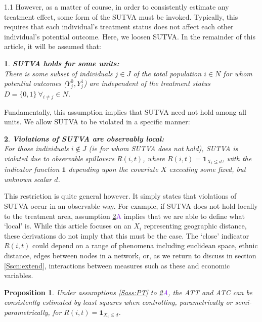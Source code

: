 \documentclass{article}
\makeatletter
\newtheorem{proposition}{Proposition}
\newtheorem*{assumption*}{\assumptionnumber}
\providecommand{\assumptionnumber}{}
\newenvironment{assumption}[2]
 {%
  \renewcommand{\assumptionnumber}{Assumption #1{#2}}%
  \begin{assumption*}%
  \protected@edef\@currentlabel{#1}%
 }
 {%
  \end{assumption*}
 }
\newcommand{\asref}[2]{\ref{#1}{\textcolor{BlueViolet}{#2}}}
\makeatother
\begin{document}
\begin{spacing}{1.1}
However, as a matter of course, in order to consistently estimate any
treatment effect, some form of the SUTVA must be invoked.  Typically,
this requires that each individual's treatment status does not affect
each other individual's potential outcome.  Here, we loosen SUTVA. 
In the remainder of this article, it will be assumed that:
\begin{assumption}{3}{}
\label{Sass:SUTVAs}
\textbf{SUTVA holds for some units:} \\
There is some subset of individuals $j\in J$ of the total population $i\in N$ 
for whom potential outcomes ($Y_j^0, Y_j^1$) are independent of the treatment 
status $D=\{0,1\}\ \forall_{i\neq j} \in N$.
\end{assumption}
\noindent Fundamentally, this assumption implies that SUTVA need not hold among 
all units.  We allow SUTVA to be violated in a specific manner:
\begin{assumption}{4}{A}
\label{Sass:SUTVAl}
\textbf{Violations of SUTVA are observably local:} \\ 
For those individuals $i\notin J$ (ie for whom SUTVA does not hold), SUTVA is
violated due to observable spillovers $R(i,t)$, where 
$R(i,t)=\mathbf{1}_{X_i\leq d}$, with the indicator function $\mathbf{1}$
depending upon the covariate $X$ exceeding some fixed, but unknown scalar $d$.
\end{assumption}
\vspace{-4mm}
\noindent This restriction is quite general however.  It simply states that
violations of SUTVA occur in an observable way.  For example, if SUTVA does
not hold locally to the treatment area, assumption \asref{Sass:SUTVAl}{A} implies
that we are able to define what `local' is.  While this article focuses on
an $X_i$ representing geographic distance, these derivations do not imply that 
this must be the case.  The `close' indicator $R(i,t)$ could depend on a range 
of phenomena including euclidean space, ethnic distance, edges between
nodes in a network, or, as we return to discuss in section
\ref{Sscn:extend}, interactions between measures such as  these and
economic variables. 


\begin{proposition}
\label{Pass:ATT}
Under assumptions \ref{Sass:PT} to \asref{Sass:SUTVAl}{A}, the ATT and ATC can be 
consistently estimated by least squares when controlling, parametrically or
semi-parametrically, for $R(i,t)=\mathbf{1}_{X_i\leq d}$.
\end{proposition}



\end{spacing}
\end{document}
